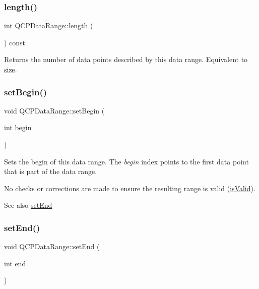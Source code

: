 \subsubsection{\texorpdfstring{length()}{length()}}
{\footnotesize\ttfamily int Q\+C\+P\+Data\+Range\+::length (\begin{DoxyParamCaption}{ }\end{DoxyParamCaption}) const\hspace{0.3cm}{\ttfamily [inline]}}

Returns the number of data points described by this data range. Equivalent to \mbox{\hyperlink{class_q_c_p_data_range_ac6af055e509d1b691c244954ff1c5887}{size}}. \mbox{\label{class_q_c_p_data_range_a54ff59048e01e46ac4aefafc844626c6}} 
\subsubsection{\texorpdfstring{set\+Begin()}{setBegin()}}
{\footnotesize\ttfamily void Q\+C\+P\+Data\+Range\+::set\+Begin (\begin{DoxyParamCaption}\item[{int}]{begin }\end{DoxyParamCaption})\hspace{0.3cm}{\ttfamily [inline]}}

Sets the begin of this data range. The {\itshape begin} index points to the first data point that is part of the data range.

No checks or corrections are made to ensure the resulting range is valid (\mbox{\hyperlink{class_q_c_p_data_range_aae53a37472212dca0a7939963e20dba0}{is\+Valid}}).

\begin{DoxySeeAlso}{See also}
\mbox{\hyperlink{class_q_c_p_data_range_a277f1a9eafe70b9184d9c00b641ae5de}{set\+End}} 
\end{DoxySeeAlso}
\mbox{\label{class_q_c_p_data_range_a277f1a9eafe70b9184d9c00b641ae5de}} 
\subsubsection{\texorpdfstring{set\+End()}{setEnd()}}
{\footnotesize\ttfamily void Q\+C\+P\+Data\+Range\+::set\+End (\begin{DoxyParamCaption}\item[{int}]{end }\end{DoxyParamCaption})\hspace{0.3cm}{\ttfamily [inline]}}

